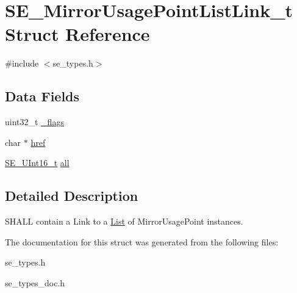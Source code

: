 \hypertarget{structSE__MirrorUsagePointListLink__t}{}\section{S\+E\+\_\+\+Mirror\+Usage\+Point\+List\+Link\+\_\+t Struct Reference}
\label{structSE__MirrorUsagePointListLink__t}


{\ttfamily \#include $<$se\+\_\+types.\+h$>$}

\subsection*{Data Fields}
\begin{DoxyCompactItemize}
\item 
uint32\+\_\+t \hyperlink{group__MirrorUsagePointListLink_ga7a496bf032accedbfb6d6c3b2fea9c22}{\+\_\+flags}
\item 
char $\ast$ \hyperlink{group__MirrorUsagePointListLink_ga5a3c1659ae4db4cd0676e59b417d6226}{href}
\item 
\hyperlink{group__UInt16_gac68d541f189538bfd30cfaa712d20d29}{S\+E\+\_\+\+U\+Int16\+\_\+t} \hyperlink{group__MirrorUsagePointListLink_gad6bab1c2ec9114c3752213d0707541fc}{all}
\end{DoxyCompactItemize}


\subsection{Detailed Description}
S\+H\+A\+LL contain a Link to a \hyperlink{structList}{List} of Mirror\+Usage\+Point instances. 

The documentation for this struct was generated from the following files\+:\begin{DoxyCompactItemize}
\item 
se\+\_\+types.\+h\item 
se\+\_\+types\+\_\+doc.\+h\end{DoxyCompactItemize}
